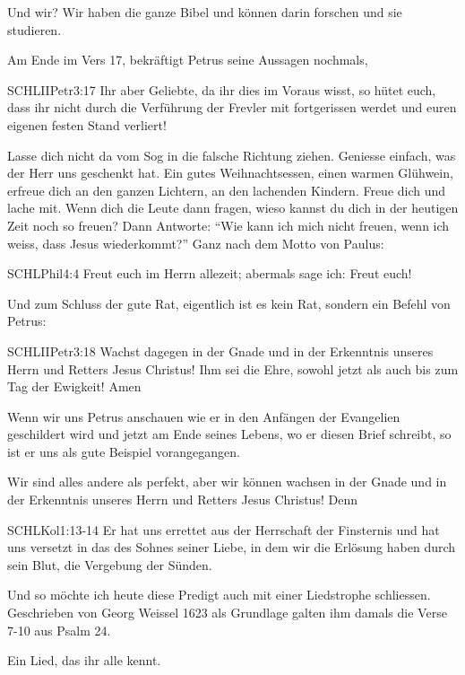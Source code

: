 \documentclass[fontsize=16pt]{mybib}
\begin{document}
Und wir? Wir haben die ganze Bibel und können darin forschen und sie studieren.

Am Ende im Vers 17, bekräftigt Petrus seine Aussagen nochmals,
\begin{bibelbox}{SCHL}{IIPetr}{3:17}
Ihr aber Geliebte, da ihr dies im Voraus wisst, so hütet euch, dass ihr nicht durch die Verführung der Frevler mit fortgerissen werdet und euren eigenen festen Stand verliert!
\end{bibelbox}
Lasse dich nicht da vom Sog in die falsche Richtung ziehen. Geniesse einfach, was der Herr uns geschenkt hat. Ein gutes Weihnachtsessen, einen warmen Glühwein, erfreue dich an den ganzen Lichtern, an den lachenden Kindern. Freue dich und lache mit. Wenn dich die Leute dann fragen, wieso kannst du dich in der heutigen Zeit noch so freuen? Dann Antworte: \enquote{Wie kann ich mich nicht freuen, wenn ich weiss, dass Jesus wiederkommt?}
Ganz nach dem Motto von Paulus:
\begin{bibelbox}{SCHL}{Phil}{4:4}
Freut euch im Herrn allezeit; abermals sage ich: Freut euch!
\end{bibelbox}

Und zum Schluss der gute Rat, eigentlich ist es kein Rat, sondern ein Befehl von Petrus:
\begin{bibelbox}{SCHL}{IIPetr}{3:18}
Wachst dagegen in der Gnade und in der Erkenntnis unseres Herrn und Retters Jesus Christus! Ihm sei die Ehre, sowohl jetzt als auch bis zum Tag der Ewigkeit! Amen
\end{bibelbox}
Wenn wir uns Petrus anschauen wie er in den Anfängen der Evangelien geschildert wird und jetzt am Ende seines Lebens, wo er diesen Brief schreibt, so ist er uns als gute Beispiel vorangegangen.

Wir sind alles andere als perfekt, aber wir können wachsen in der Gnade und in der Erkenntnis unseres Herrn und Retters Jesus Christus! Denn 
\begin{bibelbox}{SCHL}{Kol}{1:13-14}
Er hat uns errettet aus der Herrschaft der Finsternis und hat uns versetzt in das des Sohnes seiner Liebe, in dem wir die Erlösung haben durch sein Blut, die Vergebung der Sünden.
\end{bibelbox}

Und so möchte ich heute diese Predigt auch mit einer Liedstrophe schliessen. Geschrieben von Georg Weissel 1623 als Grundlage galten ihm damals die Verse 7-10 aus Psalm 24. 

Ein Lied, das ihr alle kennt.
\end{document}

